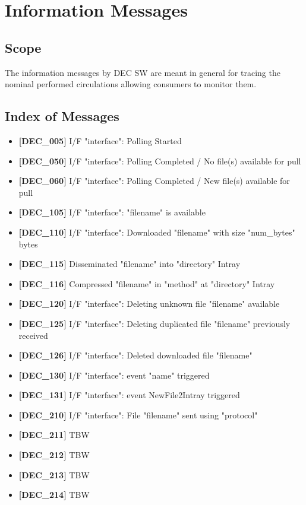 \documentclass[dec_sum_main.tex]{subfiles}
\begin{document}

\section{Information Messages}

\subsection{Scope}
The information messages by DEC SW are meant in general for tracing the nominal performed circulations allowing consumers to monitor them.

\subsection{Index of Messages}

\begin{itemize}
	\item \textbf{[DEC\_005]} I/F "interface": Polling Started
	\item \textbf{[DEC\_050]} I/F "interface": Polling Completed / No file(s) available for pull	
	\item \textbf{[DEC\_060]} I/F "interface": Polling Completed / New file(s) available for pull
	\item \textbf{[DEC\_105]} I/F "interface": "filename" is available
	\item \textbf{[DEC\_110]} I/F "interface": Downloaded "filename" with size "num\_bytes" bytes
	\item \textbf{[DEC\_115]} Disseminated "filename" into "directory" Intray
	\item \textbf{[DEC\_116]} Compressed "filename" in "method" at "directory" Intray
	\item \textbf{[DEC\_120]} I/F "interface": Deleting unknown file "filename" available
	\item \textbf{[DEC\_125]} I/F "interface": Deleting duplicated file "filename" previously received 
	\item \textbf{[DEC\_126]} I/F "interface": Deleted downloaded file "filename"
	\item \textbf{[DEC\_130]} I/F "interface": event "name" triggered  	
	\item \textbf{[DEC\_131]} I/F "interface": event NewFile2Intray triggered
	\item \textbf{[DEC\_210]} I/F "interface": File "filename" sent using "protocol"  	
	\item \textbf{[DEC\_211]} TBW
	\item \textbf{[DEC\_212]} TBW
	\item \textbf{[DEC\_213]} TBW
	\item \textbf{[DEC\_214]} TBW	
\end{itemize}
\end{document}
